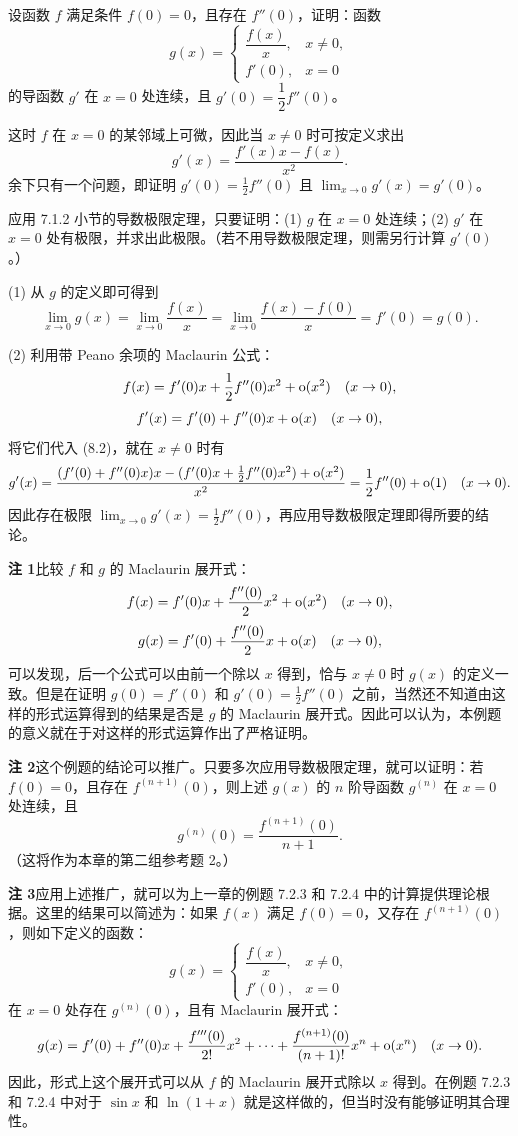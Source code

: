 \begin{xexample}[8.1.9]
设函数 $f$ 满足条件 $f(0)=0$，且存在 $f''(0)$，证明：函数
\[
  g(x)=
  \begin{cases}
    \dfrac{f(x)}{x}, & x\ne0,\\
    f'(0), & x=0
  \end{cases}
\]
的导函数 $g'$ 在 $x=0$ 处连续，且 $g'(0)=\dfrac12f''(0)$。
\end{xexample}
\begin{xsolution}
这时 $f$ 在 $x=0$ 的某邻域上可微，因此当 $x\ne0$ 时可按定义求出
\begin{equation}
  g'(x)=\frac{f'(x)x-f(x)}{x^2}.
  \tag{8.2}
  \label{eq:8.2}
\end{equation}
余下只有一个问题，即证明 $g'(0)=\frac12f''(0)$ 且 $\lim_{x\to0}g'(x)=g'(0)$。

应用 7.1.2 小节的导数极限定理，只要证明：(1) $g$ 在 $x=0$ 处连续；(2) $g'$ 在 $x=0$ 处有极限，并求出此极限。（若不用导数极限定理，则需另行计算 $g'(0)$。）

(1) 从 $g$ 的定义即可得到
\[
  \lim_{x\to0}g(x)=\lim_{x\to0}\frac{f(x)}{x}
  =\lim_{x\to0}\frac{f(x)-f(0)}x=f'(0)=g(0).
\]

(2) 利用带 Peano 余项的 Maclaurin 公式：
\[
  f(x)=f'(0)x+\frac12f''(0)x^2+\mathrm{o}(x^2)\quad(x\to0),
\]
\[
  f'(x)=f'(0)+f''(0)x+\mathrm{o}(x)\quad(x\to0),
\]
将它们代入 (8.2)，就在 $x\ne0$ 时有
\[
  g'(x)=\frac{(f'(0)+f''(0)x)x-(f'(0)x+\frac12f''(0)x^2)+\mathrm{o}(x^2)}{x^2}
  =\frac12f''(0)+\mathrm{o}(1)\quad(x\to0).
\]
因此存在极限 $\lim_{x\to0}g'(x)=\frac12f''(0)$，再应用导数极限定理即得所要的结论。

\begin{xremark}
\textbf{注 1}\quad 比较 $f$ 和 $g$ 的 Maclaurin 展开式：
\[
  f(x)=f'(0)x+\frac{f''(0)}2x^2+\mathrm{o}(x^2)\quad(x\to0),
\]
\[
  g(x)=f'(0)+\frac{f''(0)}2x+\mathrm{o}(x)\quad(x\to0),
\]
可以发现，后一个公式可以由前一个除以 $x$ 得到，恰与 $x\ne0$ 时 $g(x)$ 的定义一致。但是在证明 $g(0)=f'(0)$ 和 $g'(0)=\frac12f''(0)$ 之前，当然还不知道由这样的形式运算得到的结果是否是 $g$ 的 Maclaurin 展开式。因此可以认为，本例题的意义就在于对这样的形式运算作出了严格证明。

\textbf{注 2}\quad 这个例题的结论可以推广。只要多次应用导数极限定理，就可以证明：若 $f(0)=0$，且存在 $f^{(n+1)}(0)$，则上述 $g(x)$ 的 $n$ 阶导函数 $g^{(n)}$ 在 $x=0$ 处连续，且
\[
  g^{(n)}(0)=\frac{f^{(n+1)}(0)}{n+1}.
\]
（这将作为本章的第二组参考题 2。）

\textbf{注 3}\quad 应用上述推广，就可以为上一章的例题 7.2.3 和 7.2.4 中的计算提供理论根据。这里的结果可以简述为：如果 $f(x)$ 满足 $f(0)=0$，又存在 $f^{(n+1)}(0)$，则如下定义的函数：
\[
  g(x)=
  \begin{cases}
    \dfrac{f(x)}{x}, & x\ne0,\\
    f'(0), & x=0
  \end{cases}
\]
在 $x=0$ 处存在 $g^{(n)}(0)$，且有 Maclaurin 展开式：
\[
  g(x)=f'(0)+f''(0)x+\frac{f'''(0)}{2!}x^2+\cdots
  +\frac{f^{(n+1)}(0)}{(n+1)!}x^n+\mathrm{o}(x^n)\quad(x\to0).
\]
因此，形式上这个展开式可以从 $f$ 的 Maclaurin 展开式除以 $x$ 得到。在例题 7.2.3 和 7.2.4 中对于 $\sin x$ 和 $\ln(1+x)$ 就是这样做的，但当时没有能够证明其合理性。
\end{xremark}
\end{xsolution}


